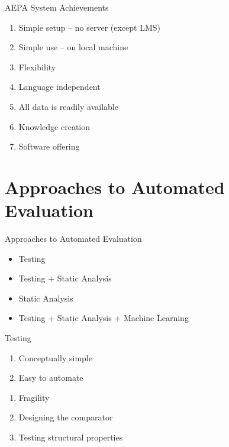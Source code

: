 \documentclass{beamer}
\begin{document}
\begin{frame}{AEPA System}
{Achievements}

\begin{enumerate}
\item Simple setup -- no server (except LMS)
\item Simple use -- on local machine
\item Flexibility
\item Language independent
\item All data is readily available
\item Knowledge creation
\item Software offering
\end{enumerate}
\end{frame}

\section{Approaches to Automated Evaluation}
\begin{frame}{Approaches to Automated Evaluation}

\begin{itemize}
\item Testing
\item Testing + Static Analysis
\item Static Analysis
\item Testing + Static Analysis + Machine Learning 
\end{itemize}
\end{frame}

\begin{frame}{Testing}

\begin{enumerate}
\item Conceptually simple
\item Easy to automate
\end{enumerate}
\pause

\vspace{0.5cm}
\begin{enumerate}
\item Fragility
\item Designing the comparator
\item Testing structural properties
\end{enumerate}
\end{frame}
\end{document}
